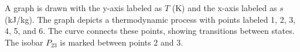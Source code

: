 A graph is drawn with the y-axis labeled as \( T \) (K) and the x-axis labeled as \( s \) (kJ/kg). The graph depicts a thermodynamic process with points labeled 1, 2, 3, 4, 5, and 6. The curve connects these points, showing transitions between states. The isobar \( P_{23} \) is marked between points 2 and 3.